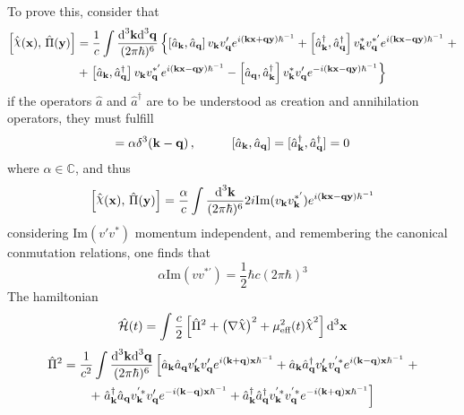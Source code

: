 To prove this, consider that
\begin{multline}
	\left[\hat{\rchi}(\mathbf{x}),\,\hat{\Pi}(\mathbf{y})\right]=\frac{1}{c}\int\frac{\td^3\mathbf{k}\td^3\mathbf{q}}{(2\pi\hbar)^6}\left\{\left[\hat{a}_\mathbf{k},\hat{a}_\mathbf{q}\right]v_\mathbf{k}v'_\mathbf{q}e^{i\left(\mathbf{kx}+\mathbf{qy}\right)\hbar^{-1}}+\left[\hat{a}_\mathbf{k}^\dagger, \hat{a}_\mathbf{q}^\dagger\right]v_\mathbf{k}^*v_\mathbf{q}^{*'}e^{i(\mathbf{kx}-\mathbf{qy})\hbar^{-1}}\right.+\\
	+\left.\left[\hat{a}_\mathbf{k},\hat{a}_\mathbf{q}^\dagger\right] v_\mathbf{k}v^{*'}_\mathbf{q}e^{i(\mathbf{kx}-\mathbf{qy})\hbar^{-1}}-\left[\hat{a}_\mathbf{q},\hat{a}_\mathbf{k}^\dagger\right]v^*_\mathbf{k}v_\mathbf{q}'e^{-i(\mathbf{kx}-\mathbf{qy})\hbar^{-1}}\right\}
\end{multline}
if the operators $\hat{a}$ and $\hat{a}^\dagger$ are to be understood as creation and annihilation operators, they must fulfill
\begin{equation}
	[\hat{a}_\mathbf{k},\hat{a}_\mathbf{q}^\dagger]=\alpha\delta^3(\mathbf{k}-\mathbf{q})\,,\hspace{1.0cm}[\hat{a}_\mathbf{k},\hat{a}_\mathbf{q}]=[\hat{a}_\mathbf{k}^\dagger,\hat{a}_\mathbf{q}^\dagger]=0
\end{equation}
where $\alpha\in\mathbb{C}$, and thus
\begin{equation}
	\left[\hat{\rchi}(\mathbf{x}),\,\hat{\Pi}(\mathbf{y})\right]=\frac{\alpha}{c}\int\frac{\td^3\mathbf{k}}{(2\pi\hbar)^6}2i\text{Im}(v_\mathbf{k}v_\mathbf{k}^{*'})e^{i(\mathbf{kx}-\mathbf{qy})\hbar^{-1}}
\end{equation}
considering Im$(v'v^*)$ momentum independent, and remembering the canonical conmutation relations, one finds that
\begin{equation}
	\alpha\text{Im}(vv^{*'})=\frac{1}{2}\hbar c(2\pi\hbar)^3
\end{equation}
The hamiltonian
\begin{equation}
	\hat{\mathcal{H}}(t)=\int\frac{c}{2}\left[\hat{\Pi}^2+\left(\mathbf{\nabla}\hat{\rchi}\right)^2+\mu_{\text{eff}}^2(t)\hat{\rchi}^2\right]\td^3\mathbf{x}
\end{equation}
\begin{multline}
	\hat{\Pi}^2=\frac{1}{c^2}\int\frac{\text{d}^3\mathbf{k}\text{d}^3\mathbf{q}}{(2\pi\hbar)^6}\left[\hat{a}_\mathbf{k}\hat{a}_\mathbf{q}v'_\mathbf{k}v'_\mathbf{q}e^{i(\mathbf{k}+\mathbf{q})\mathbf{x}\hbar^{-1}}+\hat{a}_\mathbf{k}\hat{a}_\mathbf{q}^\dagger v'_\mathbf{k}v^{'*}_\mathbf{q}e^{i(\mathbf{k}-\mathbf{q})\mathbf{x}\hbar^{-1}}\right.+\\
	+\left.\hat{a}^\dagger_\mathbf{k}\hat{a}_\mathbf{q}v^{'*}_\mathbf{k}v'_\mathbf{q}e^{-i(\mathbf{k}-\mathbf{q})\mathbf{x}\hbar^{-1}}+\hat{a}_\mathbf{k}^\dagger\hat{a}_\mathbf{q}^\dagger v^{'*}_\mathbf{k}v^{'*}_\mathbf{q}e^{-i(\mathbf{k}+\mathbf{q})\mathbf{x}\hbar^{-1}}\right]
\end{multline}
